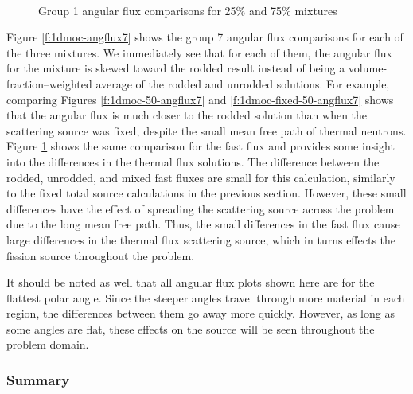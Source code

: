 \begin{figure}[H]
    \centering
    \hfill
    ~
    \caption{Group 1 angular flux comparisons for 25\% and 75\% mixtures}\label{f:1dmoc-angflux1}
\end{figure}


Figure \ref{f:1dmoc-angflux7} shows the group 7 angular flux comparisons for each of the three mixtures.  We immediately see that for each of them, the angular flux for the mixture is skewed toward the rodded result instead of being a volume-fraction--weighted average of the rodded and unrodded solutions.  For example, comparing Figures \ref{f:1dmoc-50-angflux7} and \ref{f:1dmoc-fixed-50-angflux7} shows that the angular flux is much closer to the rodded solution than when the scattering source was fixed, despite the small mean free path of thermal neutrons.  Figure \ref{f:1dmoc-angflux1} shows the same comparison for the fast flux and provides some insight into the differences in the thermal flux solutions.  The difference between the rodded, unrodded, and mixed fast fluxes are small for this calculation, similarly to the fixed total source calculations in the previous section.  However, these small differences have the effect of spreading the scattering source across the problem due to the long mean free path.  Thus, the small differences in the fast flux cause large differences in the thermal flux scattering source, which in turns effects the fission source throughout the problem.

It should be noted as well that all angular flux plots shown here are for the flattest polar angle.  Since the steeper angles travel through more material in each region, the differences between them go away more quickly.  However, as long as some angles are flat, these effects on the source will be seen throughout the problem domain.

\subsubsection{Summary}

